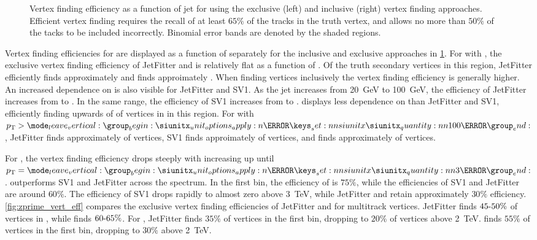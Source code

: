 \begin{figure}[!htbp]
\begin{subfigure}[b]{0.48\textwidth}
    \end{subfigure}
    \caption{Vertex finding efficiency as a function of jet \pt for \ttbarbjets using the exclusive (left) and inclusive (right) vertex finding approaches.
             Efficient vertex finding requires the recall of at least $65\%$ of the tracks in the truth vertex, and allows no more than $50\%$ of the tacks to be included incorrectly.
             Binomial error bands are denoted by the shaded regions.}
    \label{fig:ttbar_vert_eff}
\end{figure}

Vertex finding efficiencies for \ttbarbjets are displayed as a function of \pt separately for the inclusive and exclusive approaches in \cref{fig:ttbar_vert_eff}.
For \ttbarbjets with \ttbarpt, the exclusive vertex finding efficiency of JetFitter and \GNN is relatively flat as a function of \pt.
Of the truth secondary vertices in this \pt region, JetFitter efficiently finds approximately  and \GNN finds approimately .
When finding vertices inclusively the vertex finding efficiency is generally higher.
An increased dependence on \pt is also visible for JetFitter and SV1. As the jet \pt increases from \SI{20}{\GeV} to \SI{100}{\GeV}, the efficiency of JetFitter increases from  to .
In the same range, the efficiency of SV1 increases from  to .
\GNN displays less dependence on \pt than JetFitter and SV1, efficiently finding upwards of  of vertices in \bjets in this \pt region. 
For \bjets with $\pt > \SI{100}{\GeV}$, JetFitter finds approximately  of vertices, SV1 finds approimately  of vertices, and \GNN finds approximately  of vertices.

For \Zprimebjets, the vertex finding efficiency drops steeply with increasing \pt up until $\pt = \SI{3}{\TeV}$.
\GNN outperforms SV1 and JetFitter across the \pt spectrum.
In the first bin, the efficiency of \GNN is $75\%$, while the efficiencies of SV1 and JetFitter are around $60\%$.
The efficiency of SV1 drops rapidly to almost zero above \SI{3}{\TeV}, while JetFitter and \GNN retain approximately $30\%$ efficiency.
\cref{fig:zprime_vert_eff} compares the exclusive vertex finding efficiencies of JetFitter and \GNN for multitrack vertices.
JetFitter finds $45\text{\nobreakdash-}50\%$ of vertices in \ttbarbjets, while \GNN finds $60\text{\nobreakdash-}65\%$.
For \Zprimebjets, JetFitter finds $35\%$ of vertices in the first bin, dropping to $20\%$ of vertices above \SI{2}{\TeV}.
\GNN finds $55\%$ of vertices in the first bin, dropping to $30\%$ above \SI{2}{\TeV}.


